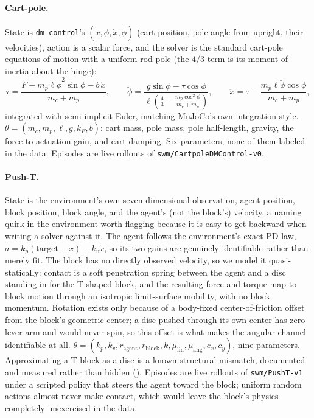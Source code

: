 \paragraph{Cart-pole.} State is \texttt{dm\_control}'s
$(x, \phi, \dot x, \dot\phi)$ (cart position, pole angle from upright,
their velocities), action is a scalar force, and the solver is the
standard cart-pole equations of motion with a uniform-rod pole (the
$4/3$ term is its moment of inertia about the hinge):
\begin{equation}
  \tau = \frac{F + m_p \ell \dot\phi^2 \sin\phi - b\, \dot x}{m_c +
    m_p}, \qquad
  \ddot\phi = \frac{g \sin\phi - \tau \cos\phi}
    {\ell\!\left(\tfrac{4}{3} - \tfrac{m_p \cos^2\phi}{m_c + m_p}\right)},
  \qquad
  \ddot x = \tau - \frac{m_p \ell \ddot\phi \cos\phi}{m_c + m_p},
\end{equation}
integrated with semi-implicit Euler, matching MuJoCo's own integration
style. $\theta = (m_c, m_p, \ell, g, k_F, b)$: cart mass, pole mass,
pole half-length, gravity, the force-to-actuation gain, and cart
damping. Six parameters, none of them labeled in the data. Episodes
are live rollouts of \texttt{swm/CartpoleDMControl-v0}.

\paragraph{Push-T.} State is the environment's own seven-dimensional
observation, agent position, block position, block angle, and the
agent's (not the block's) velocity, a naming quirk in the environment
worth flagging because it is easy to get backward when writing a
solver against it. The agent follows the environment's exact PD law,
$a = k_p(\mathrm{target} - x) - k_v \dot x$, so its two gains are
genuinely identifiable rather than merely fit. The block has no
directly observed velocity, so we model it quasi-statically: contact
is a soft penetration spring between the agent and a disc standing in
for the T-shaped block, and the resulting force and torque map to
block motion through an isotropic limit-surface mobility, with no
block momentum. Rotation exists only because of a body-fixed
center-of-friction offset from the block's geometric center; a disc
pushed through its own center has zero lever arm and would never spin,
so this offset is what makes the angular channel identifiable at all.
$\theta = (k_p, k_v, r_{\mathrm{agent}}, r_{\mathrm{block}}, k,
\mu_{\mathrm{lin}}, \mu_{\mathrm{ang}}, c_x, c_y)$, nine parameters.
Approximating a T-block as a disc is a known structural mismatch,
documented and measured rather than hidden ().
Episodes are live rollouts of \texttt{swm/PushT-v1} under a scripted
policy that steers the agent toward the block; uniform random actions
almost never make contact, which would leave the block's physics
completely unexercised in the data.

